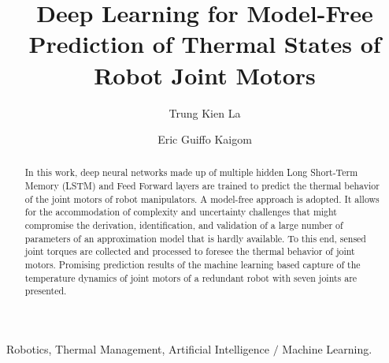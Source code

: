 \documentclass{ifacconf}
\begin{document}
\begin{frontmatter}

\title{Deep Learning for Model-Free Prediction of  Thermal States of Robot Joint Motors} 


\author[First]{Trung Kien La} 
\author[First]{Eric Guiffo Kaigom} 

\address[First]{Department of Computer Science \& Engineering,
Frankfurt University of Applied Sciences, 60318 Frankfurt am Main, Germany (e-mails: trung.la@stud.fra-uas.de; kaigom@fb2.fra-uas.de).}

\begin{abstract}                %
	In this work, deep neural networks made up of multiple hidden Long Short-Term Memory (LSTM) and Feed Forward layers are trained to predict the  thermal behavior of the joint motors of robot manipulators. A model-free approach  is adopted. It allows for the accommodation of  complexity and uncertainty challenges that might compromise the derivation, identification, and validation of a large number of  parameters of an approximation model that is hardly available. To this end, sensed joint torques are  collected  and processed  to foresee the thermal behavior of joint motors. Promising prediction results of the machine learning based capture of the temperature dynamics of joint motors of a redundant robot with seven joints are presented. 
\end{abstract}

\begin{keyword}
Robotics, Thermal Management, Artificial Intelligence $\slash$ Machine Learning.
\end{keyword}

\end{frontmatter}
\end{document}
